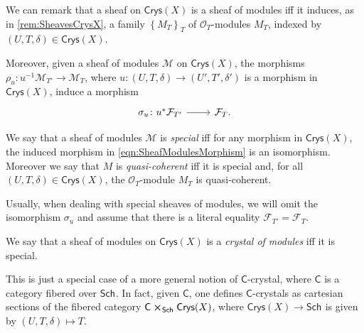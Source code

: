 \documentclass[../Main]{subfiles}
\begin{document}
\begin{rem}[]
	We can remark that a sheaf on $\mathsf{Crys}(X)$ is a sheaf of modules
	iff it induces, as in \cref{rem:SheavesCrysX}, a
	family $\left\{ M_T \right\}_{T}$ of $\mathcal{O}_{ T }$-modules $M_T$, 
	indexed by $\left(U, T, \delta\right) \in \mathsf{Crys}(X)$.

	Moreover, given a sheaf of modules $\mathcal{M}$ on $\mathsf{Crys}(X)$,
	the morphisms $\rho_u\colon u^{-1}\mathcal{M}_{T'} \to \mathcal{M}_T$,
	where $u\colon \left(U, T, \delta\right) \to \left(U', T', \delta'\right)$
	is a morphism in $\mathsf{Crys}(X)$, induce a morphism
	\begin{equation}\label{eqn:SheafModulesMorphism}
	\begin{tikzcd}[row sep = 0ex
		,/tikz/column 1/.append style={anchor=base east}
		,/tikz/column 2/.append style={anchor=base west}]
		\sigma_u\colon 
		u^* \mathcal{F}_{T'}\arrow[r, "", rightarrow] &
		\mathcal{F}_T
	.\end{tikzcd}
	\end{equation} 	
\end{rem}


\begin{defn}[]
	We say that a sheaf of modules $\mathcal{M}$ is {\em special}
	iff for any morphism in $\mathsf{Crys}(X)$,
	the induced morphism in \cref{eqn:SheafModulesMorphism}
	is an isomorphism.
	Moreover we say that $M$ is {\em quasi-coherent} iff it is special and, for all
	$\left(U, T, \delta\right) \in \mathsf{Crys}(X)$, the $\mathcal{O}_{ T }$-module
	$M_T$ is quasi-coherent.
\end{defn}


\begin{rem}[]
	Usually, when dealing with special sheaves of modules, we will omit the isomorphism
	$\sigma_u$ and assume that there is a literal equality
	$\mathcal{F}_{T'} = \mathcal{F}_T$.
\end{rem}


\begin{defn}
	We say that a sheaf of modules on $\mathsf{Crys}(X)$ is 
	a {\em crystal of modules} iff it is special.
\end{defn}


\begin{rem}[]
	This is just a special case of a more general notion 
	of $\mathsf{C}$-crystal, where $\mathsf{C}$ is a category fibered over $\mathsf{Sch}_{  }$.
	In fact, given $\mathsf{C}$, one defines $\mathsf{C}$-crystals as cartesian
	sections of the fibered category $\mathsf{C} \cross_{ \mathsf{Sch}_{  } } \mathsf{Crys}(X)$,
	where $\mathsf{Crys}(X) \to \mathsf{Sch}_{  }$ is given by $\left(U, T, \delta\right)
	\mapsto T$.
\end{rem}
\end{document}
